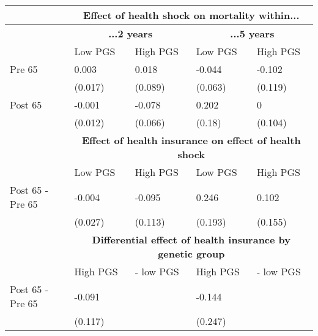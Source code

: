 % 
\begin{tabular}{l| p{2.5cm}p{2.5cm}| p{2.5cm}p{2.5cm}}
  & \multicolumn{4}{c}{\textbf{Effect of health shock on mortality within...}} \\
 \toprule
  & \multicolumn{2}{c}{ \textbf{...2 years}} &  \multicolumn{2}{c}{ \textbf{...5 years}}  \\
 \midrule
 & Low PGS & High PGS & Low PGS & High PGS \\ 
   \midrule
Pre 65 & 0.003 & 0.018 & -0.044 & -0.102 \\ 
   & (0.017) & (0.089) & (0.063) & (0.119) \\ 
  Post 65 & -0.001 & -0.078 & 0.202 & 0 \\ 
   & (0.012) & (0.066) & (0.18) & (0.104) \\ 
   \toprule & \multicolumn{4}{c}{ \textbf{Effect of health insurance on effect of health shock}} \\
 \midrule
 & Low PGS & High PGS & Low PGS & High PGS \\ 
   \midrule
Post 65 - Pre 65 & -0.004 & -0.095 & 0.246 & 0.102 \\ 
   & (0.027) & (0.113) & (0.193) & (0.155) \\ 
   \toprule & \multicolumn{4}{c}{ \textbf{Differential effect of health insurance by genetic group}} \\
 \midrule
 & High PGS  & - low PGS & High PGS  & - low PGS \\ 
   \midrule
Post 65 - Pre 65 & -0.091 &  & -0.144 &  \\ 
   & (0.117) &  & (0.247) &  \\ 
  \end{tabular}
